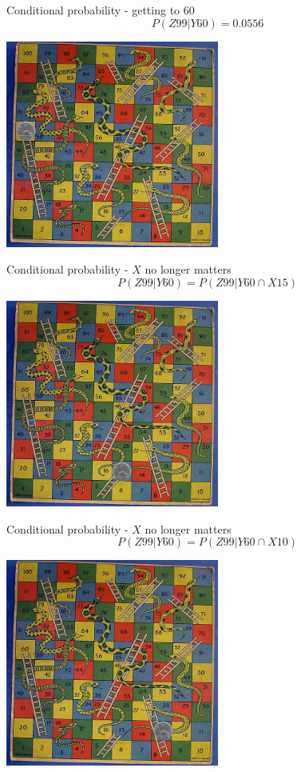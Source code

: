 \documentclass{beamer}
\newcommand{\crish}{\color{reddish}}
\newcommand{\cbla}{\color{black}}
\begin{document}
\begin{frame}{Conditional probability - getting to 60}
    \crish $$ P(Z99|Y60)=0.0556 $$ \cbla
  \begin{center}
    \includegraphics[width=7cm]{game60.jpg}
  \end{center}
\end{frame}

\begin{frame}{Conditional probability - \crish$X$\cbla{} no longer matters}
    \crish $$ P(Z99|Y60)=P(Z99|Y60\cap{}X15) $$ \cbla
  \begin{center}
    \includegraphics[width=7cm]{game15.jpg}
  \end{center}
\end{frame}


\begin{frame}{Conditional probability - \crish$X$\cbla{} no longer matters}
  \crish $$ P(Z99|Y60)=P(Z99|Y60\cap{}X10) $$ \cbla
    \begin{center}
    \includegraphics[width=7cm]{game13.jpg}
  \end{center}
\end{frame}
\end{document}

